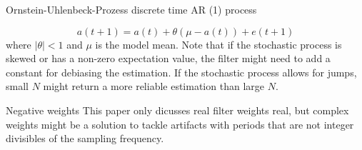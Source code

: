 \documentclass[a4paper]{article}
\begin{document}
Ornstein-Uhlenbeck-Prozess discrete time AR (1) process

\begin{equation}
    a(t+1) = a(t) + \theta(\mu-a(t)) + e(t+1)
\end{equation}
where $\left|\theta\right|<1$ and $\mu$ is the model mean.
Note that if the stochastic process is skewed or has a non-zero expectation value, the filter might need to add a constant for debiasing the estimation. If the stochastic process allows for jumps, small $N$ might return a more reliable estimation than large $N$.

Negative weights
This paper only dicusses real filter weights real, but complex weights might be a solution to tackle artifacts with periods that are not integer divisibles of the sampling frequency.



\end{document}
